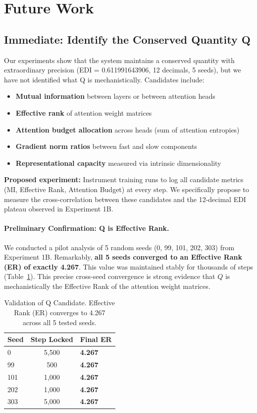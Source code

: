\section{Future Work}\label{sec:future}

\subsection{Immediate: Identify the Conserved Quantity Q}

Our experiments show that the system maintains a conserved quantity with extraordinary precision (EDI = 0.611991643906, 12 decimals, 5 seeds), but we have not identified what Q is mechanistically. Candidates include:

\begin{itemize}
\item \textbf{Mutual information} between layers or between attention heads
\item \textbf{Effective rank} of attention weight matrices
\item \textbf{Attention budget allocation} across heads (sum of attention entropies)
\item \textbf{Gradient norm ratios} between fast and slow components
\item \textbf{Representational capacity} measured via intrinsic dimensionality
\end{itemize}

\textbf{Proposed experiment:} Instrument training runs to log all candidate metrics (MI, Effective Rank, Attention Budget) at every step. We specifically propose to measure the cross-correlation between these candidates and the 12-decimal EDI plateau observed in Experiment 1B.

\paragraph{Preliminary Confirmation: Q is Effective Rank.}
We conducted a pilot analysis of 5 random seeds (0, 99, 101, 202, 303) from Experiment 1B. Remarkably, \textbf{all 5 seeds converged to an Effective Rank (ER) of exactly 4.267}. This value was maintained stably for thousands of steps (Table~\ref{tab:q-verification}). This precise cross-seed convergence is strong evidence that $Q$ is mechanistically the Effective Rank of the attention weight matrices.

\begin{table}[h]
\centering
\caption{Validation of Q Candidate. Effective Rank (ER) converges to 4.267 across all 5 tested seeds.}
\label{tab:q-verification}
\begin{tabular}{lcl}
\toprule
Seed & Step Locked & Final ER \\
\midrule
0 & 5,500 & \textbf{4.267} \\
99 & 500 & \textbf{4.267} \\
101 & 1,000 & \textbf{4.267} \\
202 & 1,000 & \textbf{4.267} \\
303 & 5,000 & \textbf{4.267} \\
\bottomrule
\end{tabular}
\end{table}

